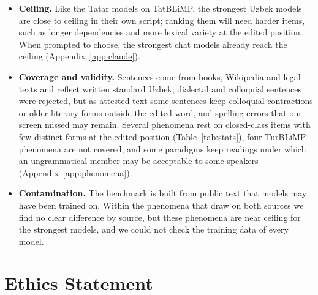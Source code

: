 \documentclass[11pt]{article}
\begin{document}
\begin{itemize}
\item \textbf{Ceiling.} Like the Tatar models on TatBLiMP, the strongest Uzbek models are close to ceiling in their own script; ranking them will need harder items, such as longer dependencies and more lexical variety at the edited position. When prompted to choose, the strongest chat models already reach the ceiling (Appendix~\ref{app:claude}).
\item \textbf{Coverage and validity.} Sentences come from books, Wikipedia and legal texts and reflect written standard Uzbek; dialectal and colloquial sentences were rejected, but as attested text some sentences keep colloquial contractions or older literary forms outside the edited word, and spelling errors that our screen missed may remain. Several phenomena rest on closed-class items with few distinct forms at the edited position (Table~\ref{tab:stats}), four TurBLiMP phenomena are not covered, and some paradigms keep readings under which an ungrammatical member may be acceptable to some speakers (Appendix~\ref{app:phenomena}).
\item \textbf{Contamination.} The benchmark is built from public text that models may have been trained on. Within the phenomena that draw on both sources we find no clear difference by source, but these phenomena are near ceiling for the strongest models, and we could not check the training data of every model.
\end{itemize}

\section*{Ethics Statement}
\end{document}
